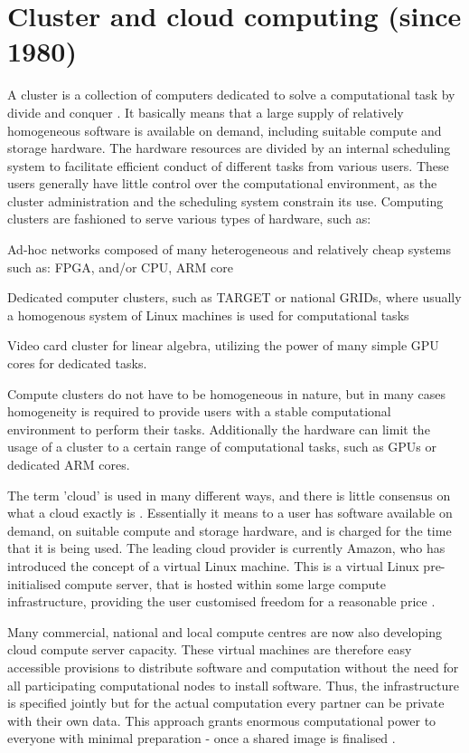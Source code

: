 \section{Cluster and cloud computing (since 1980)}
A cluster is a collection of computers dedicated to solve a computational task by divide and conquer \cite{Silva:1999, Qiu:2010}. It 
basically means that a large supply of relatively homogeneous software is available on demand, including suitable compute and storage 
hardware. The hardware resources are divided by an internal scheduling system to facilitate efficient conduct of different tasks from 
various users. These users generally have little control over the computational environment, as the cluster administration and the 
scheduling system constrain its use. Computing clusters are fashioned to serve various types of hardware, such as:

Ad-hoc networks composed of many heterogeneous and relatively cheap systems such as: FPGA, and/or CPU, ARM core

Dedicated computer clusters, such as TARGET or national GRIDs, where usually a homogenous system of Linux machines is used for computational tasks

Video card cluster for linear algebra, utilizing the power of many simple GPU cores for dedicated tasks.

Compute clusters do not have to be homogeneous in nature, but in many cases homogeneity is required to provide users with a stable 
computational environment to perform their tasks. Additionally the hardware can limit the usage of a cluster to a certain range of 
computational tasks, such as GPUs or dedicated ARM cores.

The term 'cloud' is used in many different ways, and there is little consensus on what a cloud exactly is \cite{Foster:2008}. Essentially 
it means to a user has software available on demand, on suitable compute and storage hardware, and is charged for the time that it is 
being used. The leading cloud provider is currently Amazon, who has introduced the concept of a virtual Linux machine. This is a virtual 
Linux pre-initialised compute server, that is hosted within some large compute infrastructure, providing the user customised freedom for 
a reasonable price \cite{Trelles:2011}.

Many commercial, national and local compute centres are now also developing cloud compute server capacity. These virtual machines are 
therefore easy accessible provisions to distribute software and computation without the need for all participating computational nodes 
to install software. Thus, the infrastructure is specified jointly \cite{Foster:2008} but for the actual computation every partner can 
be private with their own data. This approach grants enormous computational power to everyone with minimal preparation - once a shared 
image is finalised \cite{Krampis:2012}.

